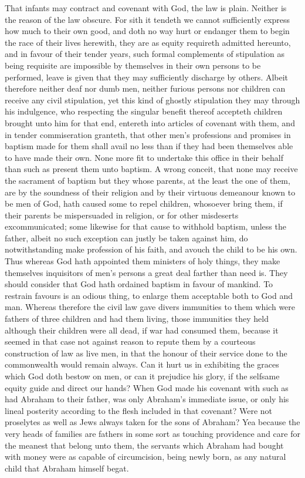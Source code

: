 That infants may contract and covenant with God, the law is plain. Neither is the reason of the law obscure. For sith it tendeth we cannot sufficiently express how much to their own good, and doth no way hurt or endanger them to begin the race of their lives herewith, they are as equity requireth admitted hereunto, and in favour of their tender years, such formal complements of stipulation as being requisite are impossible by themselves in their own persons to be performed, leave is given that they may sufficiently discharge by others. Albeit therefore neither deaf nor dumb men, neither furious persons nor children can receive any civil stipulation, yet this kind of ghostly stipulation they may through his indulgence, who respecting the singular benefit thereof accepteth children brought unto him for that end, entereth into articles of covenant with them, and in tender commiseration granteth, that other men’s professions and promises in baptism made for them shall avail no less than if they had been themselves able to have made their own.
None more fit to undertake this office in their behalf than such as present them unto baptism. A wrong conceit, that none may receive the sacrament of baptism but they whose parents, at the least the one of them, are by the soundness of their religion and by their virtuous demeanour known to be men of God, hath caused some to repel children, whosoever bring them, if their parents be mispersuaded in religion, or for other misdeserts excommunicated; some likewise for that cause to withhold baptism, unless the father, albeit no such exception can justly be taken against him, do notwithstanding make profession of his faith, and avouch the child to be his own. Thus whereas God hath appointed  them ministers of holy things, they make themselves inquisitors of men’s persons a great deal farther than need is.
They should consider that God hath ordained baptism in favour of mankind. To restrain favours is an odious thing, to enlarge them acceptable both to God and man. Whereas therefore the civil law gave divers immunities to them which were fathers of three children and had them living, those immunities they held although their children were all dead, if war had consumed them, because it seemed in that case not against reason to repute them by a courteous construction of law as live men, in that the honour of their service done to the commonwealth would remain always. Can it hurt us in exhibiting the graces which God doth bestow on men, or can it prejudice his glory, if the selfsame equity guide and direct our hands?
When God made his covenant with such as had Abraham to their father, was only Abraham’s immediate issue, or only his lineal posterity according to the flesh included in that covenant? Were not proselytes as well as Jews always taken for the sons of Abraham? Yea because the very heads of families are fathers in some sort as touching providence and care for the meanest that belong unto them, the servants which Abraham had bought with money were as capable of  circumcision, being newly born, as any natural child that Abraham himself begat.
